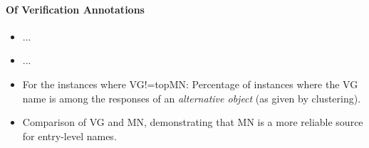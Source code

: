 \paragraph{Of Verification Annotations}




\begin{itemize}
	\item ...
	\item ...
	\item For the instances where VG!=topMN: Percentage of instances where the VG name is among the responses of an \textit{alternative object} (as given by clustering).
	\item Comparison of VG and MN, demonstrating that MN is a more reliable source for entry-level names. 
\end{itemize}


